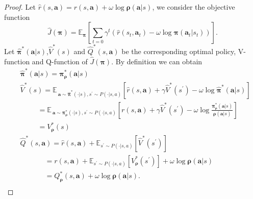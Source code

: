 \documentclass{article}
\begin{document}
	\begin{proof}\label{proof1}
		Let $\hat{r}(s,\bm{a}) = r(s,\bm{a}) + \omega \log {\bm{\rho}}(\bm{a}|s) $, we consider the objective function
		$$
		\hat{J}({\bm{\pi}}) = \mathbb{E}_{\bm{\pi}}\left[ \sum_{t = 0} \gamma^t \left(\hat{r}(s_t,\bm{a}_t ) - \omega \log {\bm{\pi}}(\bm{a}_t|s_t) \right)  \right].$$
		Let $\hat{{\bm{\pi}}}^*(\bm{a}|s)$,$\hat{V}^*(s)$ and $\hat{Q}^*(s,\bm{a})$ be the corresponding optimal policy, V-function and Q-function of $\hat{J}({\bm{\pi}})$. By definition we can obtain
		\begin{align*}
			& \hat{{\bm{\pi}}}^*(\bm{a}|s) = {\bm{\pi}}_{\bm{\rho}}^*(\bm{a}|s) \\
			& \hat{V}^*(s) = \mathbb{E}_{\
				\bm{a} \sim \hat{{\bm{\pi}}}^*(\cdot|s) ,s^\prime \sim P(\cdot | s, a) }\left[\hat{r}(s,\bm{a}) + \gamma \hat{V}^*(s^{\prime} ) - \omega \log \hat{{\bm{\pi}}}^*(\bm{a}|s) \right] \\
			& \qquad \ \  =  \mathbb{E}_{\
				\bm{a} \sim {\bm{\pi}}_{\bm{\rho}}^*(\cdot|s), s^\prime \sim P(\cdot | s, a)}\left[r(s,\bm{a}) + \gamma \hat{V}^*(s^{\prime} ) - \omega \log \frac{{\bm{\pi}}_{\bm{\rho}}^*(\bm{a}|s )}{{\bm{\rho}}(\bm{a}|s)} \right] \\
			& \qquad \ \ = V^*_{\bm{\rho}}(s) \\
			& \hat{Q}^*(s,\bm{a}) = \hat{r}(s,\bm{a}) + \mathbb{E}_{s^\prime \sim P(\cdot | s, a)}\left[\hat{V}^*(s^{\prime}) \right] \\
			& \qquad  \quad \ \  = r(s,\bm{a})  + \mathbb{E}_{s^\prime \sim P(\cdot | s, a)}\left[V_{\bm{\rho}}^*(s^{\prime}) \right] + \omega \log {\bm{\rho}}(\bm{a} |s)   \\
			& \qquad  \quad \ \ = Q^*_{\bm{\rho}}(s,\bm{a}) + \omega \log {\bm{\rho}}(\bm{a} |s).\\	
		\end{align*}
		

\end{proof}
\end{document}
